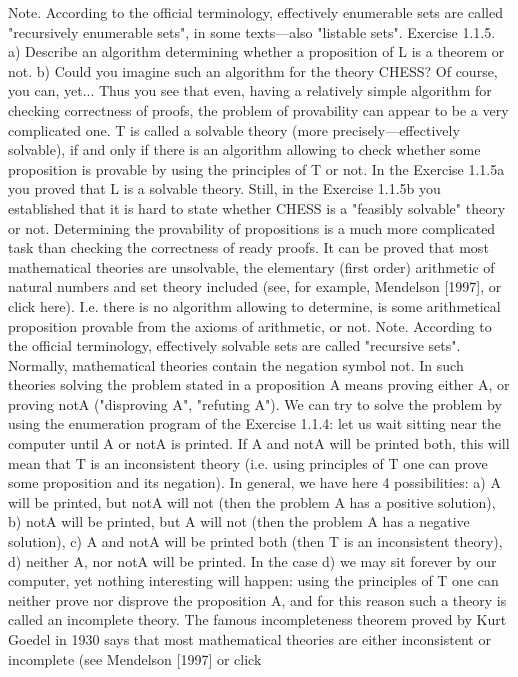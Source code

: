 Note. According to the official terminology, effectively enumerable sets are called "recursively
enumerable sets", in some texts---also "listable sets".
Exercise 1.1.5. a) Describe an algorithm determining whether a proposition of L is a theorem or not.
b) Could you imagine such an algorithm for the theory CHESS? Of course, you can, yet... Thus you see
that even, having a relatively simple algorithm for checking correctness of proofs, the problem of
provability can appear to be a very complicated one.
T is called a solvable theory (more precisely---effectively solvable), if and only if there is an algorithm
allowing to check whether some proposition is provable by using the principles of T or not. In the
Exercise 1.1.5a you proved that L is a solvable theory. Still, in the Exercise 1.1.5b you established that it
is hard to state whether CHESS is a "feasibly solvable" theory or not. Determining the provability of
propositions is a much more complicated task than checking the correctness of ready proofs. It can
be proved that most mathematical theories are unsolvable, the elementary (first order) arithmetic of
natural numbers and set theory included (see, for example, Mendelson [1997], or click here). I.e. there is
no algorithm allowing to determine, is some arithmetical proposition provable from the axioms of
arithmetic, or not.
Note. According to the official terminology, effectively solvable sets are called "recursive sets".
Normally, mathematical theories contain the negation symbol not. In such theories solving the problem
stated in a proposition A means proving either A, or proving notA ("disproving A", "refuting A"). We can
try to solve the problem by using the enumeration program of the Exercise 1.1.4: let us wait sitting near
the computer until A or notA is printed. If A and notA will be printed both, this will mean that T is an
inconsistent theory (i.e. using principles of T one can prove some proposition and its negation). In
general, we have here 4 possibilities:
a) A will be printed, but notA will not (then the problem A has a positive solution),
b) notA will be printed, but A will not (then the problem A has a negative solution),
c) A and notA will be printed both (then T is an inconsistent theory),
d) neither A, nor notA will be printed.
In the case d) we may sit forever by our computer, yet nothing interesting will happen: using the
principles of T one can neither prove nor disprove the proposition A, and for this reason such a theory is
called an incomplete theory. The famous incompleteness theorem proved by Kurt Goedel in 1930 says
that most mathematical theories are either inconsistent or incomplete (see Mendelson [1997] or click
